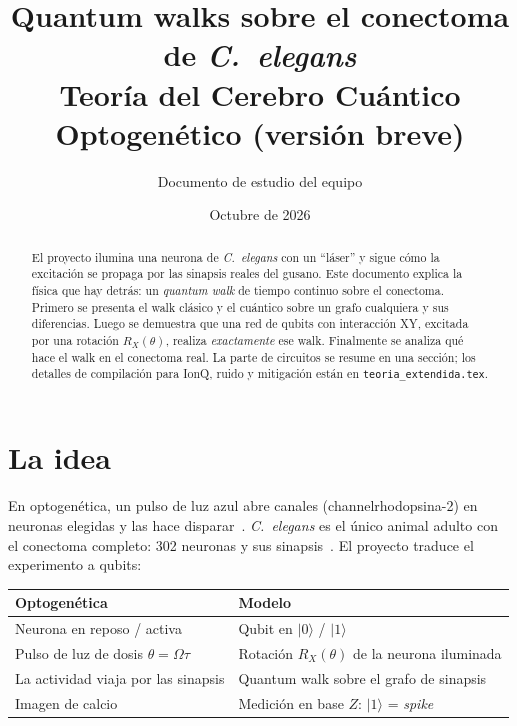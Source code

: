 \documentclass[11pt,a4paper]{article}
\title{\textbf{Quantum walks sobre el conectoma de \emph{C.~elegans}}\\[4pt]
\large Teoría del Cerebro Cuántico Optogenético (versión breve)}
\author{Documento de estudio del equipo}
\date{Octubre de 2026}
\renewcommand{\ket}[1]{\lvert #1\rangle}
\newcommand{\RX}{R_X}
\newcommand{\code}[1]{\texttt{#1}}
\theoremstyle{plain}
\theoremstyle{definition}
\theoremstyle{remark}
\begin{document}
\maketitle

\begin{abstract}
\noindent
El proyecto ilumina una neurona de \emph{C.~elegans} con un ``láser'' y sigue cómo la excitación se propaga por las sinapsis reales del gusano. Este documento explica la física que hay detrás: un \emph{quantum walk} de tiempo continuo sobre el conectoma. Primero se presenta el walk clásico y el cuántico sobre un grafo cualquiera y sus diferencias. Luego se demuestra que una red de qubits con interacción XY, excitada por una rotación $\RX(\theta)$, realiza \emph{exactamente} ese walk. Finalmente se analiza qué hace el walk en el conectoma real. La parte de circuitos se resume en una sección; los detalles de compilación para IonQ, ruido y mitigación están en \code{teoria\_extendida.tex}.
\end{abstract}

\section{La idea}

En optogenética, un pulso de luz azul abre canales (channelrhodopsina-2) en neuronas elegidas y las hace disparar~\cite{boyden2005,nagel2005}. \emph{C.~elegans} es el único animal adulto con el conectoma completo: 302 neuronas y sus sinapsis~\cite{white1986,cook2019}. El proyecto traduce el experimento a qubits:

\begin{center}
\renewcommand{\arraystretch}{1.2}
\begin{tabular}{@{}L{0.42\textwidth}L{0.5\textwidth}@{}}
\toprule
\textbf{Optogenética} & \textbf{Modelo}\\
\midrule
Neurona en reposo / activa & Qubit en $\ket0$ / $\ket1$\\
Pulso de luz de dosis $\theta=\Omega\tau$ & Rotación $\RX(\theta)$ de la neurona iluminada\\
La actividad viaja por las sinapsis & Quantum walk sobre el grafo de sinapsis\\
Imagen de calcio & Medición en base $Z$: $\ket1$ = \emph{spike}\\
\bottomrule
\end{tabular}
\end{center}
\end{document}
